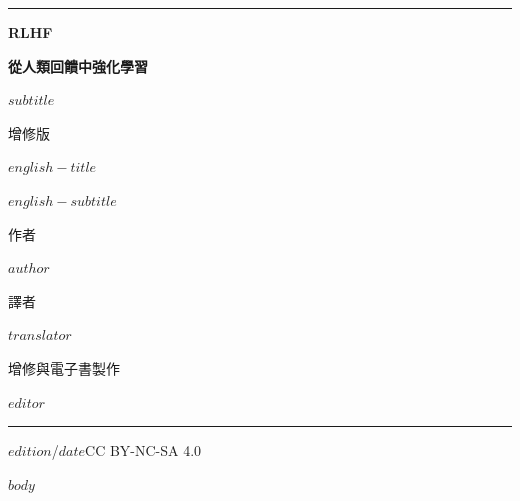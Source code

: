 \documentclass[11pt,a4paper,oneside]{book}
\begin{document}
\begin{titlepage}
\thispagestyle{empty}
\raggedright\color{CoverInk}\sffamily
\linespread{1}\selectfont
\setlength{\parskip}{0pt}
\vspace*{8mm}
{\color{BookTeal}\rule{18mm}{2pt}}\par
\vspace{9mm}
{\fontsize{86}{90}\selectfont\bfseries RLHF}\par
\vspace{6mm}
{\fontsize{28}{38}\selectfont\bfseries 從人類回饋中強化學習}\par
\vspace{4mm}
{\fontsize{13}{20}\selectfont\color{CoverMuted}$subtitle$}\par
\vspace{6mm}
{\fontsize{10}{14}\selectfont\color{BookTeal}增修版}\par
\vspace{17mm}
\begin{minipage}{110mm}
\raggedright
{\rmfamily\fontsize{24}{29}\selectfont $english-title$\par}
\vspace{4mm}
{\sffamily\fontsize{11}{16}\selectfont\color{CoverMuted}$english-subtitle$\par}
\end{minipage}\par
\vfill
{\fontsize{9}{13}\selectfont\color{CoverMuted}作者}\par
\vspace{2mm}
{\fontsize{18}{24}\selectfont $author$}\par
\vspace{8mm}
\begin{minipage}[t]{0.52\linewidth}
{\fontsize{9}{13}\selectfont\color{CoverMuted}譯者}\par
\vspace{2mm}
{\fontsize{11}{16}\selectfont $translator$}\par
\end{minipage}%
\begin{minipage}[t]{0.48\linewidth}
{\fontsize{9}{13}\selectfont\color{CoverMuted}增修與電子書製作}\par
\vspace{2mm}
{\fontsize{11}{16}\selectfont $editor$}\par
\end{minipage}\par
\vspace{9mm}
{\color{CoverRule}\rule{\linewidth}{0.4pt}}\par
\vspace{3mm}
{\fontsize{8}{12}\selectfont\color{CoverMuted}%
$edition$\quad /\quad $date$\hfill CC BY-NC-SA 4.0}\par
\vspace*{2mm}
\end{titlepage}
\frontmatter
\begingroup
\hypersetup{linkcolor=black}
\tableofcontents
\clearpage
\endgroup
\mainmatter
$body$
\end{document}
